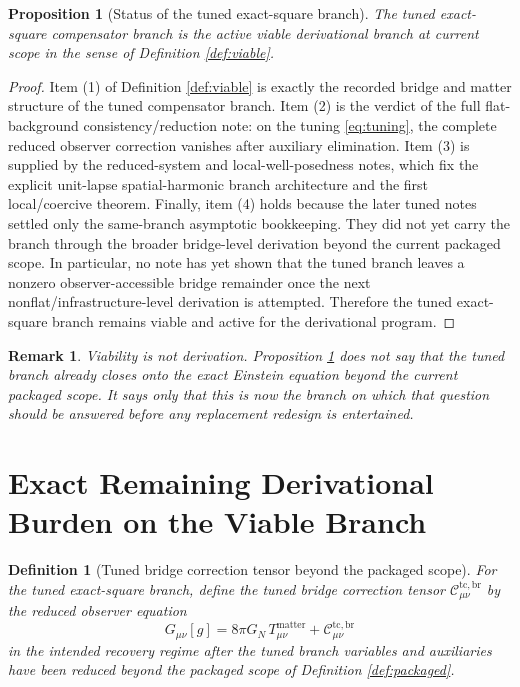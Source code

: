 \documentclass[11pt]{article}
\newtheorem{definition}{Definition}
\newtheorem{proposition}{Proposition}
\newtheorem{remark}{Remark}
\begin{document}
\begin{proposition}[Status of the tuned exact-square branch]
\label{prop:viable}
The tuned exact-square compensator branch is the active viable derivational branch at current scope in the sense of Definition \ref{def:viable}.
\end{proposition}

\begin{proof}
Item (1) of Definition \ref{def:viable} is exactly the recorded bridge and matter structure of the tuned compensator branch. Item (2) is the verdict of the full flat-background consistency/reduction note: on the tuning \eqref{eq:tuning}, the complete reduced observer correction vanishes after auxiliary elimination. Item (3) is supplied by the reduced-system and local-well-posedness notes, which fix the explicit unit-lapse spatial-harmonic branch architecture and the first local/coercive theorem. Finally, item (4) holds because the later tuned notes settled only the same-branch asymptotic bookkeeping. They did not yet carry the branch through the broader bridge-level derivation beyond the current packaged scope. In particular, no note has yet shown that the tuned branch leaves a nonzero observer-accessible bridge remainder once the next nonflat/infrastructure-level derivation is attempted. Therefore the tuned exact-square branch remains viable and active for the derivational program.
\end{proof}

\begin{remark}
Viability is not derivation. Proposition \ref{prop:viable} does not say that the tuned branch already closes onto the exact Einstein equation beyond the current packaged scope. It says only that this is now the branch on which that question should be answered before any replacement redesign is entertained.
\end{remark}

\section{Exact Remaining Derivational Burden on the Viable Branch}

\begin{definition}[Tuned bridge correction tensor beyond the packaged scope]
\label{def:Ctc}
For the tuned exact-square branch, define the \emph{tuned bridge correction tensor} \(\mathcal C_{\mu\nu}^{\mathrm{tc,br}}\) by the reduced observer equation
\begin{equation}
G_{\mu\nu}[g]
=
8\pi G_N\,T_{\mu\nu}^{\mathrm{matter}}
+ \mathcal C_{\mu\nu}^{\mathrm{tc,br}}
\label{eq:tunedbridgeeq}
\end{equation}
in the intended recovery regime after the tuned branch variables and auxiliaries have been reduced beyond the packaged scope of Definition \ref{def:packaged}.
\end{definition}
\end{document}
